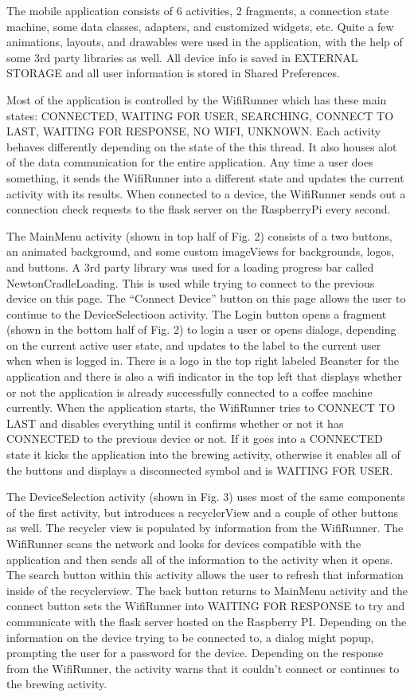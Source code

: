 \documentclass[conference]{IEEEtran}
\begin{document}
The mobile application consists of 6 activities,
2 fragments, a connection state machine, some data
classes, adapters, and customized widgets, etc. Quite a few
animations, layouts, and drawables were used in the application,
with the help of some 3rd party libraries as well. All
device info is saved in EXTERNAL STORAGE and all user
information is stored in Shared Preferences.

Most of the application is controlled by the WifiRunner
which has these main states: CONNECTED, WAITING
FOR USER, SEARCHING, CONNECT TO LAST,
WAITING FOR RESPONSE, NO WIFI, UNKNOWN. Each
activity behaves differently depending on the state of the this
thread. It also houses alot of the data communication for the
entire application. Any time a user does something, it sends
the WifiRunner into a different state and updates the current
activity with its results. When connected to a device, the
WifiRunner sends out a connection check requests to the flask
server on the RaspberryPi every second.

The MainMenu activity (shown in top half of Fig. 2)
consists of a two buttons, an animated background, and some
custom imageViews for backgrounds, logos, and buttons. A
3rd party library was used for a loading progress bar called
NewtonCradleLoading. This is used while trying to connect
to the previous device on this page. The ``Connect Device''
button on this page allows the user to continue to the DeviceSelectioon
activity. The Login button opens a fragment
(shown in the bottom half of Fig. 2) to login a user or
opens dialogs, depending on the current active user state, and
updates to the label to the current user when when is logged
in. There is a logo in the top right labeled Beanster for the
application and there is also a wifi indicator in the top left that
displays whether or not the application is already successfully
connected to a coffee machine currently. When the application
starts, the WifiRunner tries to CONNECT TO LAST and
disables everything until it confirms whether or not it has
CONNECTED to the previous device or not. If it goes into a
CONNECTED state it kicks the application into the brewing
activity, otherwise it enables all of the buttons and displays a
disconnected symbol and is WAITING FOR USER.

The DeviceSelection activity (shown in Fig. 3) uses most
of the same components of the first activity, but introduces a
recyclerView and a couple of other buttons as well. The recycler
view is populated by information from the WifiRunner. The
WifiRunner scans the network and looks for devices compatible
with the application and then sends all of the information
to the activity when it opens. The search button within this
activity allows the user to refresh that information inside
of the recyclerview. The back button returns to MainMenu
activity and the connect button sets the WifiRunner into
WAITING FOR RESPONSE to try and communicate with
the flask server hosted on the Raspberry PI. Depending on
the information on the device trying to be connected to, a
dialog might popup, prompting the user for a password for
the device. Depending on the response from the WifiRunner,
the activity warns that it couldn't connect or continues to the
brewing activity.
\end{document}
